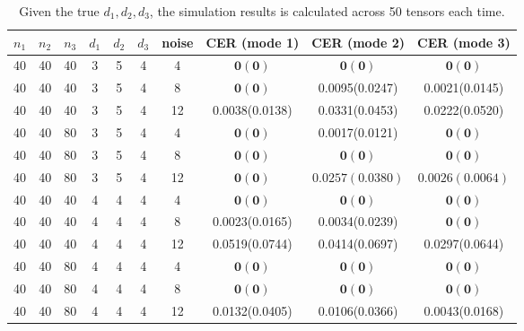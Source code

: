 \documentclass{article}
\begin{document}
\begin{appendices}
\begin{table}[http]
	\centering
	\begin{tabular}{|c|c|c|c|c|c|c|c|c|c|}
		\hline
		$n_1$&$n_2$&$n_3$&$d_1$&$d_2$&$d_3$&noise&CER (mode 1)&CER (mode 2)&CER (mode 3)\\ \hline
		40&40&40&3&5&4&4&
		$\mathbf{0(0)}$&$\mathbf{0(0)}$&$\mathbf{0(0)}$\\
		40&40&40&3&5&4&8&$\mathbf{0(0)}$&0.0095(0.0247)&0.0021(0.0145) \\
		40&40&40&3&5&4&12&0.0038(0.0138)&0.0331(0.0453)&0.0222(0.0520)\\

		40&40&80&3&5&4&4&$\mathbf{0(0)}$&0.0017(0.0121)&$\mathbf{0(0)}$\\
		40&40&80&3&5&4&8&$\mathbf{0(0)}$&$\mathbf{0(0)}$&$\mathbf{0(0)}$\\
		40&40&80&3&5&4&12&$\mathbf{0(0)}$&$0.0257(0.0380)$&$0.0026(0.0064)$\\

		40&40&40&4&4&4&4&$\mathbf{0(0)}$&$\mathbf{0(0)}$&$\mathbf{0(0)}$\\
		40&40&40&4&4&4&8&0.0023(0.0165)&0.0034(0.0239)&$\mathbf{0(0)}$\\
		40&40&40&4&4&4&12&0.0519(0.0744)&0.0414(0.0697)&0.0297(0.0644)\\
		
		40&40&80&4&4&4&4&$\mathbf{0(0)}$&$\mathbf{0(0)}$&$\mathbf{0(0)}$\\
		40&40&80&4&4&4&8&$\mathbf{0(0)}$&$\mathbf{0(0)}$&$\mathbf{0(0)}$\\
		40&40&80&4&4&4&12&0.0132(0.0405)&0.0106(0.0366)&0.0043(0.0168) \\
		\hline
	\end{tabular}
	\caption{Given the true $d_1,d_2,d_3$, the simulation results is calculated across 50 tensors each time. }
	\label{t1}
\end{table}




\end{appendices}
\end{document}
